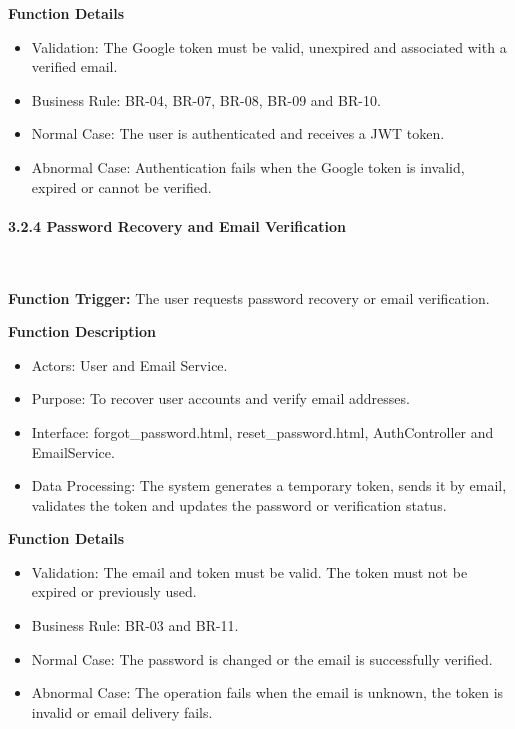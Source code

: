 \textbf{Function Details}
\begin{itemize}[leftmargin=1.5em, nosep]
    \item Validation: The Google token must be valid, unexpired and associated with a verified email.
    \item Business Rule: BR-04, BR-07, BR-08, BR-09 and BR-10.
    \item Normal Case: The user is authenticated and receives a JWT token.
    \item Abnormal Case: Authentication fails when the Google token is invalid, expired or cannot be verified.
\end{itemize}

\paragraph*{3.2.4 Password Recovery and Email Verification}\leavevmode\\[-0.5em]
\label{par:password-recovery-email-verification}

\textbf{Function Trigger:} The user requests password recovery or email verification.

\textbf{Function Description}
\begin{itemize}[leftmargin=1.5em, nosep]
    \item Actors: User and Email Service.
    \item Purpose: To recover user accounts and verify email addresses.
    \item Interface: forgot\_password.html, reset\_password.html, AuthController and EmailService.
    \item Data Processing: The system generates a temporary token, sends it by email, validates the token and updates the password or verification status.
\end{itemize}

\textbf{Function Details}
\begin{itemize}[leftmargin=1.5em, nosep]
    \item Validation: The email and token must be valid. The token must not be expired or previously used.
    \item Business Rule: BR-03 and BR-11.
    \item Normal Case: The password is changed or the email is successfully verified.
    \item Abnormal Case: The operation fails when the email is unknown, the token is invalid or email delivery fails.
\end{itemize}

